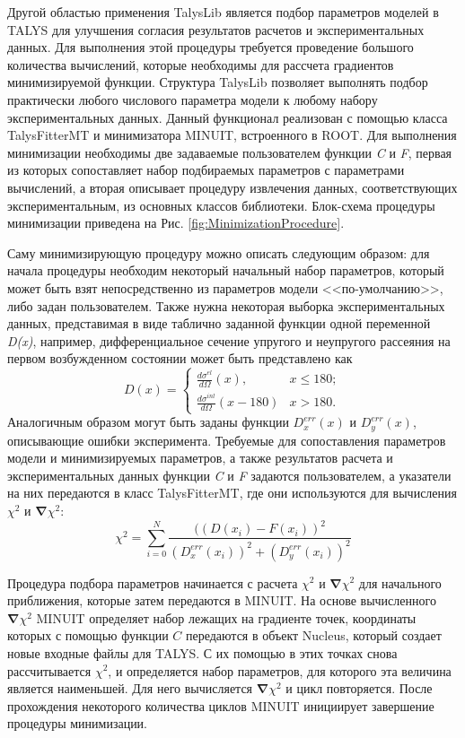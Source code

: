 \documentclass[a4paper,12pt]{extarticle}
\begin{document}
Другой областью применения TalysLib является подбор параметров моделей в TALYS для улучшения согласия результатов расчетов и экспериментальных данных. Для выполнения этой процедуры требуется проведение большого количества вычислений, которые необходимы для рассчета градиентов минимизируемой функции. Структура TalysLib позволяет выполнять подбор практически любого числового параметра модели к любому набору экспериментальных данных. Данный функционал реализован с помощью класса TalysFitterMT и минимизатора MINUIT, встроенного в ROOT. Для выполнения минимизации необходимы две задаваемые пользователем функции \textit{C} и \textit{F}, первая из которых сопоставляет набор подбираемых параметров с параметрами вычислений, а вторая описывает процедуру извлечения данных, соответствующих экспериментальным, из основных классов библиотеки. Блок-схема процедуры минимизации приведена на Рис. \ref{fig:MinimizationProcedure}.

Саму минимизирующую процедуру можно описать следующим образом: для начала процедуры необходим некоторый начальный набор параметров, который может быть взят непосредственно из параметров модели <<по-умолчанию>>, либо задан пользователем. Также нужна некоторая выборка экспериментальных данных, представимая в виде таблично заданной функции одной переменной \textit{D(x)}, например, дифференциальное сечение упругого и неупругого рассеяния на первом возбужденном состоянии может быть представлено как 
\begin{equation}
D(x)=
	\begin{cases}
	\frac{d\sigma^{el}}{d\Omega}(x), & x\leq 180;\\
	\frac{d\sigma^{inl}}{d\Omega}(x-180) & x>180.
	\end{cases}
\end{equation}
Аналогичным образом могут быть заданы функции $D^{err}_x(x)$ и $D^{err}_y(x)$, описывающие ошибки эксперимента.
Требуемые для сопоставления параметров модели и минимизируемых параметров, а также результатов расчета и экспериментальных данных функции \textit{C} и \textit{F} задаются пользователем, а указатели на них передаются в класс TalysFitterMT, где они используются для вычисления $\chi^2$ и $\mathbf{\nabla} \chi^2$:
\begin{equation}
\chi^2=\sum\limits_{i=0}^N\frac{((D(x_i)-F(x_i))^2}{(D^{err}_x(x_i))^2+(D^{err}_y(x_i))^2}
\end{equation}

Процедура подбора параметров начинается с расчета $\chi^2$ и $\mathbf{\nabla} \chi^2$ для начального приближения, которые затем передаются в MINUIT. На основе вычисленного $\mathbf{\nabla} \chi^2$ MINUIT определяет набор лежащих на градиенте точек, координаты которых с помощью функции $C$ передаются в объект Nucleus, который создает новые входные файлы для TALYS. С их помощью в этих точках снова рассчитывается $\chi^2$, и определяется набор параметров, для которого эта величина является наименьшей. Для него вычисляется $\mathbf{\nabla} \chi^2$ и цикл повторяется. После прохождения некоторого количества циклов MINUIT инициирует завершение процедуры минимизации. 
\end{document}
